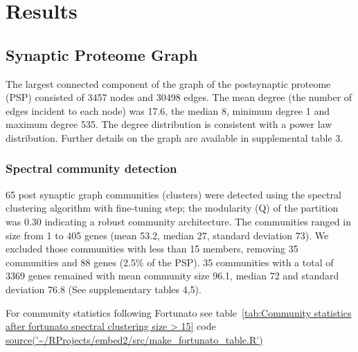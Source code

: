 \section{Results}

\subsection{Synaptic Proteome Graph}

The largest connected component of the graph of the postsynaptic proteome (PSP) consisted of 3457 nodes and 30498 edges. The mean degree (the number of edges incident to each node) was 17.6, the median 8, minimum degree 1 and maximum degree 535. The degree distribution is consistent with a power law distribution. Further details on the graph are available in supplemental table 3. 
\subsubsection{Spectral community detection}
65 post synaptic graph communities (clusters) were detected using the spectral clustering algorithm with fine-tuning step; the modularity (Q) of the partition was 0.30 indicating a robust community architecture.  The communities ranged in size from 1 to 405 genes (mean 53.2, median 27, standard deviation 73). We excluded those communities with less than 15 members, removing 35 communities and 88 genes (2.5\% of the PSP). 35 communities with a total of 3369 genes remained with mean community size 96.1, median 72 and standard deviation 76.8 (See supplementary tables 4,5).   

For community statistics following Fortunato \cite{fortunato2016community} see table~\ref{tab:Community statistics after fortunato spectral clustering size > 15} 
code \url{source('~/RProjects/embed2/src/make_fortunato_table.R')}




